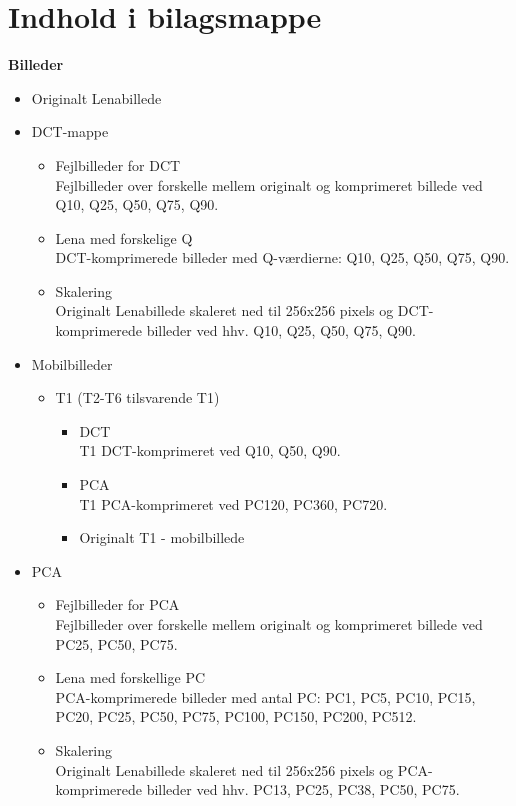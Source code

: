 \chapter{Indhold i bilagsmappe}\label{dropbox}
\textbf{Billeder}
\begin{itemize}
\item Originalt Lenabillede
\item DCT-mappe
	\begin{itemize}
	\item Fejlbilleder for DCT \\
	Fejlbilleder over forskelle mellem originalt og komprimeret billede ved Q10, Q25, Q50, Q75, Q90.
	
	\item Lena med forskelige Q \\
	DCT-komprimerede billeder med Q-værdierne: Q10, Q25, Q50, Q75, Q90.
	
	\item Skalering \\
	Originalt Lenabillede skaleret ned til 256x256 pixels og DCT-komprimerede billeder ved hhv. Q10, Q25, Q50, Q75, Q90.
	\end{itemize}
\item Mobilbilleder
	\begin{itemize}
	\item T1 (T2-T6 tilsvarende T1)
		\begin{itemize}
		\item DCT \\
		T1 DCT-komprimeret ved Q10, Q50, Q90.
		\item PCA \\
		T1 PCA-komprimeret ved PC120, PC360, PC720.
		\item Originalt T1 - mobilbillede
		\end{itemize}
	\end{itemize}
\item PCA
	\begin{itemize}
	\item Fejlbilleder for PCA \\
	Fejlbilleder over forskelle mellem originalt og komprimeret billede ved PC25, PC50, PC75.

	\item Lena med forskellige PC \\
	PCA-komprimerede billeder med antal PC: PC1, PC5, PC10, PC15, PC20, PC25, PC50, PC75, PC100, PC150, PC200, PC512.
	
	\item Skalering \\
	Originalt Lenabillede skaleret ned til 256x256 pixels og PCA-komprimerede billeder ved hhv. PC13, PC25, PC38, PC50, PC75.
	\end{itemize}
\end{itemize}
